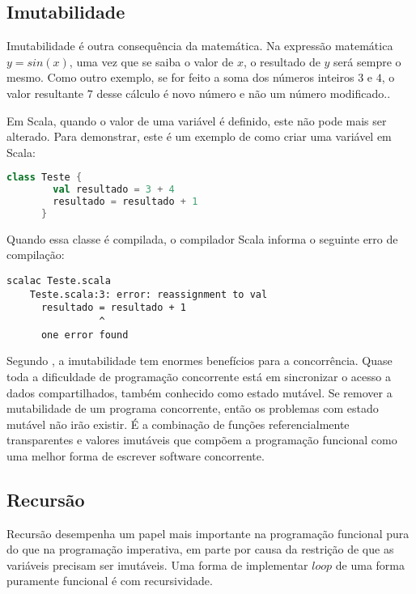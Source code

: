     \subsection{Imutabilidade}

    Imutabilidade é outra consequência da matemática. Na expressão matemática $y = sin (x)$, uma vez que se saiba o valor de $x$, o resultado de $y$ será sempre o mesmo. Como outro exemplo, se for feito a soma dos números inteiros $3$ e $4$, o valor resultante $7$ desse cálculo é novo número e não um número modificado.\cite{progScala2}.

    Em Scala, quando o valor de uma variável é definido, este não pode mais ser alterado. Para demonstrar, este é um exemplo de como criar uma variável em Scala:

    \begin{lstlisting}[language=Scala, mathescape=false]
      class Teste {
        val resultado = 3 + 4
        resultado = resultado + 1
      }
    \end{lstlisting}

    Quando essa classe é compilada, o compilador Scala informa o seguinte erro de compilação:

    \begin{lstlisting}[mathescape=false]
    scalac Teste.scala
    Teste.scala:3: error: reassignment to val
      resultado = resultado + 1
                ^
      one error found
    \end{lstlisting}

    Segundo , a imutabilidade tem enormes benefícios para a concorrência. Quase toda a dificuldade de programação concorrente está em sincronizar o acesso a dados compartilhados, também conhecido como estado mutável. Se remover a mutabilidade de um programa concorrente, então os problemas com estado mutável não irão existir. É a combinação de funções referencialmente transparentes e valores imutáveis ​​que compõem a programação funcional como uma melhor forma de escrever software concorrente.

    \subsection{Recursão}

    Recursão desempenha um papel mais importante na programação funcional pura do que na programação imperativa, em parte por causa da restrição de que as variáveis precisam ser imutáveis​​. Uma forma de implementar $loop$ de uma forma puramente funcional é com recursividade.

